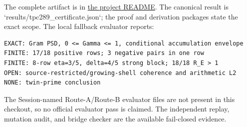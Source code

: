 \documentclass[10pt]{article}
\begin{document}
The complete artifact is in
\href{../README.md}{the project README}.  The canonical result is
`results/tpc289\_certificate.json`; the proof and derivation packages state the
exact scope.  The local fallback evaluator reports:

\begin{verbatim}
EXACT: Gram PSD, 0 <= Gamma <= 1, conditional accumulation envelope
FINITE: 17/18 positive rows; 3 negative pairs in one row
FINITE: 8-row eta=3/5, delta=4/5 strong block; 18/18 R_E > 1
OPEN: source-restricted/growing-shell coherence and arithmetic L2
NONE: twin-prime conclusion
\end{verbatim}

The Session-named Route-A/Route-B evaluator files are not present in this
checkout, so no official evaluator pass is claimed.  The independent replay,
mutation audit, and bridge checker are the available fail-closed evidence.



\end{document}
